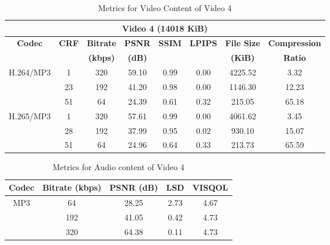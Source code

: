 \documentclass{ioereport}
\begin{document}
    \begin{table}[H]
        \centering
        \caption{Metrics for Video Content of Video 4}
        \label{table:vid-met-4}
        \begin{tabular}{|c|c|c|c|c|c|c|c|}
        \hline
        \multicolumn{8}{|c|}{\textbf{Video 4 (14018 KiB)}} \\ \hline
        \multirow{2}{*}{\textbf{Codec}} & \multirow{2}{*}{\textbf{CRF}} & \textbf{Bitrate} & \textbf{PSNR} & \textbf{SSIM} & \textbf{LPIPS} & \textbf{File Size} & \textbf{Compression} \\ 
        &  & \textbf{(kbps)} & \textbf{(dB)} &  &  & \textbf{(KiB)} & \textbf{Ratio} \\ \hline
        \multirow{3}{*}{H.264/MP3} & 1  & 320 & 59.10 & 0.99 & 0.00 & 4225.52 & 3.32 \\ \cline{2-8} 
                                   & 23 & 192 & 41.20 & 0.98 & 0.00 & 1146.30 & 12.23 \\ \cline{2-8} 
                                   & 51 & 64  & 24.39 & 0.61 & 0.32 & 215.05  & 65.18 \\ \hline
        \multirow{3}{*}{H.265/MP3} & 1  & 320 & 57.61 & 0.99 & 0.00 & 4061.62 & 3.45 \\ \cline{2-8} 
                                   & 28 & 192 & 37.99 & 0.95 & 0.02 & 930.10  & 15.07 \\ \cline{2-8} 
                                   & 51 & 64  & 24.96 & 0.64 & 0.33 & 213.73  & 65.59 \\ \hline
        \end{tabular}
    \end{table}


    \begin{table}[H]
        \centering
        \caption{Metrics for Audio content of Video 4}
        \label{table:aud-met-4}
        \begin{tabular}{|c|c|c|c|c|}
        \hline
        \textbf{Codec} & \textbf{Bitrate (kbps)} & \textbf{PSNR (dB)} & \textbf{LSD} & \textbf{VISQOL} \\ \hline
        \multirow{3}{*}{MP3} & 64  & 28.25 & 2.73 & 4.67 \\ \cline{2-5} 
                                   & 192 & 41.05 & 0.42 & 4.73 \\ \cline{2-5} 
                                   & 320 & 64.38 & 0.11 & 4.73 \\ \hline
        \end{tabular}
    \end{table}
    
\end{document}
